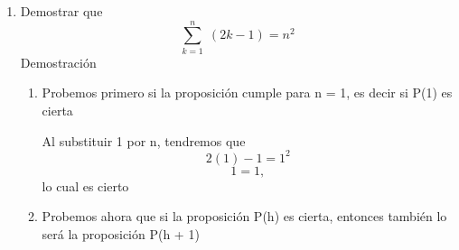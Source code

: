 \documentclass{article}
\begin{document}
\begin {enumerate}
\begin {enumerate}
Si P(h) es cierta, llamada hipótesis de inducción, se tiene que 
\begin {equation}
\label {pregunta 30 ec 8}
\displaystyle \sum_{k=1}^{n} \; h^2 = \frac{h(h+1)(2h+1)}{6} = 1 + 4 + 9 + 16 + 25 ... + n^2
\end {equation}
A partir de aquí, queremos llegar a ver si P(h + 1) es cierta, es decir, queremos ver si se cumple que
\begin {equation}
\label {pregunta 30 ec 9}
\displaystyle \sum_{k=0}^{n} \; (h+1)^2 = \frac{(h+1)(h+2)(2h+3)}{6}
\end {equation}
Consideremos el lado izquierdo de la igualdad (\ref {pregunta 30 ec 9}), tendremos que 
$$\displaystyle \sum_{k=0}^{n} \; (h+1)^2 =1 + 4 + 9 + 16 + ... + n^2 + (n + 1)^2 $$
Reemplazando la hipótesis de inducción (\ref{pregunta 30 ec 8}), se tiene
\begin{align*}
\displaystyle \sum_{k=0}^{n} \; (h+1)^2 &= \frac {h(h+1)(2h+1)}{6} + (h + 1)^2 \\
\displaystyle \sum_{k=0}^{n} \; (h+1)^2 &= \frac {h(h+1)(2h+1) + 6(h + 1)^2}{6} \\
\displaystyle \sum_{k=0}^{n} \; (h+1)^2 &= \frac {(h+1)[h(2h+1) + 6(h + 1)]}{6} \\
\displaystyle \sum_{k=0}^{n} \; (h+1)^2 &= \frac {(h+1)[2h^2 + h + 6h + 6])}{6} \\
\displaystyle \sum_{k=0}^{n} \; (h+1)^2 &= \frac {(h+1)[2h^2 + 7h + 6])}{6} \\
\displaystyle \sum_{k=0}^{n} \; (h+1)^2 &= \frac {(h+1)[(2h + 4)(2h + 3])}{6} \\
\displaystyle \sum_{k=0}^{n} \; (h+1)^2 &= \frac {(h+1)[(h +2)(2h + 3])}{6}
\end{align*}
Hemos demostrado entonces que P(h + 1) es verdadera.
\\

Por lo tanto, si P(1) y P(h + 1) es verdadera, se verifica entonces la validez de la ecuación.
\end {enumerate}
\item
Demostrar que 
\begin {equation}
\displaystyle \sum_{k=1}^{n} \; (2k - 1) = n^2
\end{equation}
Demostración

\begin {enumerate}
\item
Probemos primero si la proposición cumple para n = 1, es decir si P(1) es cierta

Al substituir 1 por n, tendremos que
$$2(1) - 1 = 1^2$$
$$1 = 1,$$
 lo cual es cierto 
\item
Probemos ahora que si la proposición P(h) es cierta, entonces también lo será la proposición P(h + 1)


\end{enumerate}
\end{enumerate}
\end{document}
